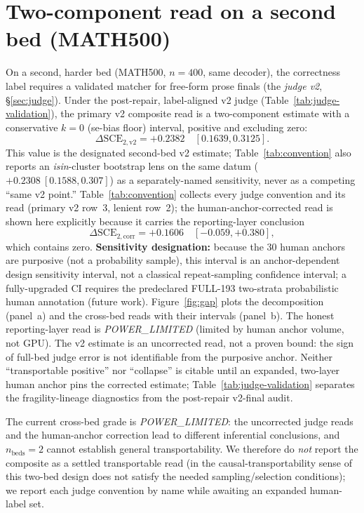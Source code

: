 \documentclass{article}
\begin{document}
\section{Two-component read on a second bed (MATH500)}
\label{sec:calib:bed2}

On a second, harder bed (MATH500, $n=400$, same decoder), the correctness label
requires a validated matcher for free-form prose finals (the \emph{judge v2},
\S\ref{sec:judge}).  Under the post-repair, label-aligned v2 judge
(Table~\ref{tab:judge-validation}), the primary v2 composite read is a
two-component estimate with a conservative $k{=}0$ (se-bias floor) interval,
positive and excluding zero:
\[
\Delta\mathrm{SCE}_{2,\mathrm{v2}}=+0.2382
\quad [0.1639,0.3125].
\]
This value is the designated second-bed v2 estimate; Table~\ref{tab:convention}
also reports an \emph{isin}-cluster bootstrap lens on the same datum
($+0.2308\ [0.1588,0.307]$) as a separately-named sensitivity, never as a competing
``same v2 point.''  Table~\ref{tab:convention} collects
every judge convention and its read (primary v2 row~3, lenient row~2); the
human-anchor-corrected read is shown here explicitly because it carries the
reporting-layer conclusion
\[
\Delta\mathrm{SCE}_{2,\mathrm{corr}}=+0.1606\quad [-0.059,+0.380],
\]
which contains zero.  \textbf{Sensitivity designation:} because the 30 human anchors
are purposive (not a probability sample), this interval is an anchor-dependent
design sensitivity interval, not a classical repeat-sampling confidence interval; a
fully-upgraded CI requires the predeclared FULL-193 two-strata probabilistic human
annotation (future work).  Figure~\ref{fig:gap} plots the decomposition (panel~a) and the
cross-bed reads with their intervals (panel~b).  The honest reporting-layer read is
\emph{POWER\_LIMITED} (limited by human anchor volume, not GPU).  The
v2 estimate is an uncorrected read, not a proven bound: the sign of full-bed
judge error is not identifiable from the purposive anchor.  Neither ``transportable
positive'' nor ``collapse'' is citable until an expanded, two-layer human anchor
pins the corrected estimate; Table~\ref{tab:judge-validation} separates the
fragility-lineage diagnostics from the post-repair v2-final audit.

The current cross-bed grade is \emph{POWER\_LIMITED}: the uncorrected judge reads and
the human-anchor correction lead to different inferential conclusions, and
$n_{\text{beds}}=2$ cannot establish general transportability.  We therefore do
\emph{not} report the composite as a settled transportable read
(in the causal-transportability sense of \citealp{pearl2014transportability}
this two-bed design does not satisfy the needed sampling/selection conditions); we
report each judge convention by name while awaiting an expanded human-label set.
\end{document}
